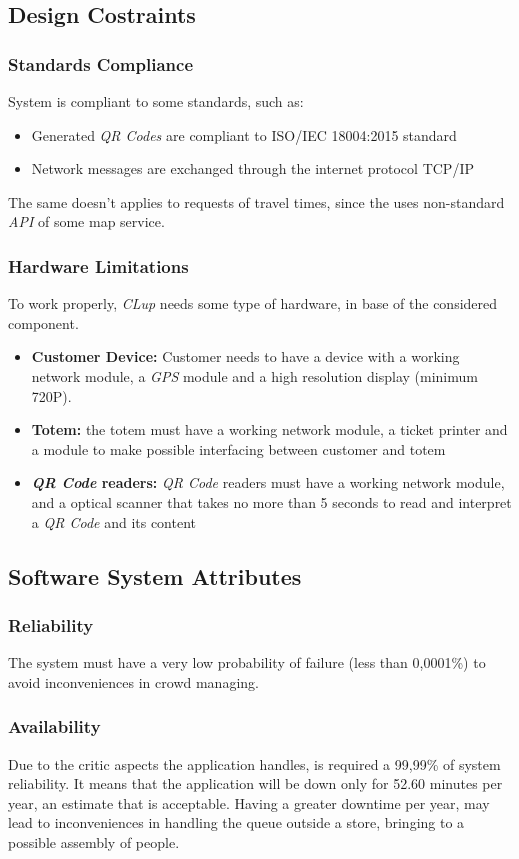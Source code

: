 \documentclass{article}
\begin{document}
	\newpage
	
	\subsection{Design Costraints}
		\subsubsection{Standards Compliance}
	System is compliant to some standards, such as:
	\begin{itemize}
		\item Generated \emph{QR Codes} are compliant to ISO/IEC 18004:2015 standard
		\item Network messages are exchanged through the internet protocol TCP/IP
	\end{itemize}
The same doesn't applies to requests of travel times, since the uses non-standard \emph{API} of some map service.
		\subsubsection{Hardware Limitations}
		To work properly, \emph{CLup} needs some type of hardware, in base of the considered component.
		\begin{itemize}
			\item {\bfseries Customer Device:} Customer needs to have a device with a working network module, a \emph{GPS} module and a high resolution display (minimum 720P).
			\item {\bfseries Totem:} the totem must have a working network module, a ticket printer and a module to make possible interfacing between customer and totem
			\item {\bfseries \emph{QR Code} readers:} \emph{QR Code} readers must have a working network module, and a optical scanner that takes no more than 5 seconds to read and interpret a \emph{QR Code} and its content
		\end{itemize}
	
	\subsection{Software System Attributes}
		\subsubsection{Reliability}
		The system must have a  very low probability of failure (less than 0,0001\%) to avoid inconveniences in crowd managing.
		\subsubsection{Availability}
		Due to the critic aspects the application handles, is required a 99,99\% of system reliability. It means that the application will be down only for 52.60 minutes per year, an estimate that is acceptable. Having a greater downtime per year, may lead to inconveniences in handling the queue outside a store, bringing to a possible assembly of people.
\end{document}
